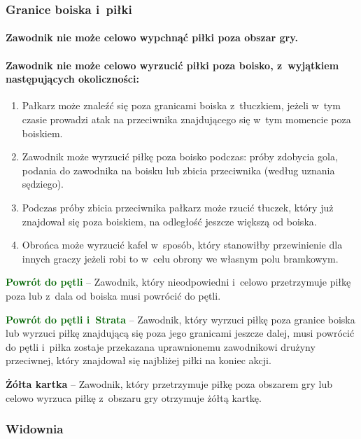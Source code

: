\documentclass[12pt]{article}
\newcommand\yellowcard[1]{\bgroup\textcolor{darkyellow}{\textbf{#1}}}
\newcommand\other[1]{\bgroup\textcolor{darkgreen}{\textbf{#1}}}
\begin{document}
\subsubsection{Granice boiska i~piłki}

\paragraph{Zawodnik nie może celowo wypchnąć piłki poza obszar gry.}

\paragraph{Zawodnik nie może celowo wyrzucić piłki poza boisko, z~wyjątkiem następujących okoliczności:}

\begin{enumerate}
	\item
	      Pałkarz może znaleźć się poza granicami boiska z~tłuczkiem, jeżeli w~tym czasie prowadzi atak na przeciwnika znajdującego się w~tym
	      momencie poza boiskiem.
	\item
	      Zawodnik może wyrzucić piłkę poza boisko podczas: próby zdobycia gola,
	      podania do zawodnika na boisku lub zbicia przeciwnika (według uznania
	      sędziego).
	\item
	      Podczas próby zbicia przeciwnika pałkarz może rzucić tłuczek, który
	      już znajdował się poza boiskiem, na odległość jeszcze większą od
	      boiska.
	\item
	      Obrońca może wyrzucić kafel w~sposób, który stanowiłby przewinienie
	      dla innych graczy jeżeli robi to w~celu obrony we własnym polu
	      bramkowym.
\end{enumerate}

\other{Powrót do pętli} -- Zawodnik, który nieodpowiedni i~celowo
przetrzymuje piłkę poza lub z~dala od boiska musi powrócić do pętli.

\other{Powrót do pętli i~Strata} -- Zawodnik, który wyrzuci piłkę poza
granice boiska lub wyrzuci piłkę znajdującą się poza jego granicami
jeszcze dalej, musi powrócić do pętli i~piłka zostaje przekazana
uprawnionemu zawodnikowi drużyny przeciwnej, który znajdował się
najbliżej piłki na koniec akcji.

\yellowcard{Żółta kartka} -- Zawodnik, który przetrzymuje piłkę poza obszarem
gry lub celowo wyrzuca piłkę z~obszaru gry otrzymuje żółtą kartkę.

\subsubsection{Widownia}
\end{document}
